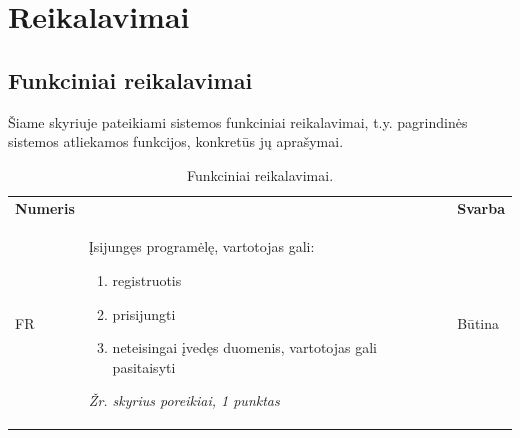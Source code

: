 \documentclass{VUMIFPSkursinis}
\begin{document}
\section{Reikalavimai}
\subsection{Funkciniai reikalavimai }
Šiame skyriuje pateikiami sistemos funkciniai reikalavimai, t.y. pagrindinės sistemos atliekamos funkcijos, konkretūs jų aprašymai.

\newcommand\rownumberfr{\stepcounter{frcount}\arabic{frcount}}

\begin{longtable}{ | >{\centering}m{2cm} | m{10cm} | >{\centering}m{2.5cm} | } \caption{Funkciniai reikalavimai.} \endhead \hline
\multicolumn{3}{ |l| }{\textbf{Funkciniai reikalavimai:}} \tabularnewline \hline
\textbf{Numeris} & \centering{\textbf{Reikalavimas}} & \textbf{Svarba} \tabularnewline \hline

FR\rownumberfr & Įsijungęs programėlę, vartotojas gali:
						\begin{enumerate}
							\item registruotis
							\item prisijungti
							\item neteisingai įvedęs duomenis, vartotojas gali pasitaisyti
						\end{enumerate}
				\textit{Žr. skyrius poreikiai, 1 punktas} & Būtina\tabularnewline \hline


\end{longtable}
\end{document}
